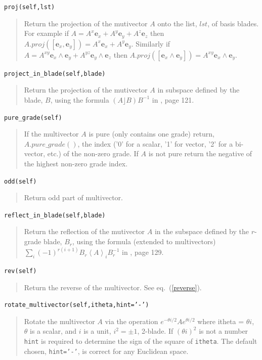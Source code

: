 \documentclass[12pt]{report}
\newcommand{\bm}[1]{\boldsymbol{#1}}
\newcommand{\lp}{\left (}
\newcommand{\rp}{\right )}
\newcommand{\W}{\wedge}
\newcommand{\grade}[1]{\left < {#1} \right >}
\newcommand{\paren}[1]{\lp {#1} \rp}
\newcommand{\eb}{\bm{e}}
\newcommand{\T}[1]{\texttt{#1}}
\begin{document}
\T{proj(self,lst)}
\begin{quote}
    Return the projection of the mutivector $A$ onto the list, $lst$, of basis blades.  For example if 
    $A = A^{x}\eb_{x}+A^{y}\eb_{y}+A^{z}\eb_{z}$ then $A.proj\paren{[\eb_{x},\eb_{y}]} = A^{x}\eb_{x}+A^{y}\eb_{y}$. 
    Similarly if $A = A^{xy}\eb_{x}\W\eb_{y}+A^{yz}\eb_{y}\W\eb_{z}$ then 
    $A.proj\paren{[\eb_{x}\W\eb_{y}]} = A^{xy}\eb_{x}\W\eb_{y}$.
\end{quote}



\T{project\_in\_blade(self,blade)}
\begin{quote}
    Return the projection of the mutivector $A$ in subspace defined by the blade, $B$, using the formula
    $\paren{A\rfloor B}B^{-1} $ in \cite{Macdonald 1}, page 121.
\end{quote}

\T{pure\_grade(self)}
\begin{quote}
	If the multivector $A$ is pure (only contains one grade) return, $A.pure\_grade()$, the index ('0' for a scalar,
    '1' for vector,	'2' for a bi-vector, etc.) of the non-zero grade.  If $A$ is not pure return the negative of the
    highest non-zero grade index.   
\end{quote}

\T{odd(self)}
\begin{quote}
	Return odd part of multivector.
\end{quote}

\T{reflect\_in\_blade(self,blade)}
\begin{quote}
    Return the reflection of the mutivector $A$ in the subspace defined by the $r$-grade blade, $B_{r}$, using the formula
    (extended to multivectors) $\sum_{i} \paren{-1}^{r\paren{i+1}}{B}_{r}\grade{A}_{i}B_{r}^{-1}$ in
    \cite{Macdonald 1}, page 129.
\end{quote}

\T{rev(self)}
\begin{quote}
   Return the reverse of the multivector.  See eq.~(\ref{reverse}).
\end{quote}

\T{rotate\_multivector(self,itheta,hint='-')}
\begin{quote}
    Rotate the multivector $A$ via the operation $e^{-\theta i/2}Ae^{\theta i/2}$
    where itheta = $\theta i$, $\theta$ is a scalar, and $i$ is a unit, $i^{2} = \pm 1$, 2-blade.
    If $\paren{\theta i}^{2}$ is not a number \T{hint} is required to determine the sign of the
    square of \T{itheta}.  The default chosen, \T{hint='-'}, is correct for any Euclidean space.
\end{quote}
\end{document}
